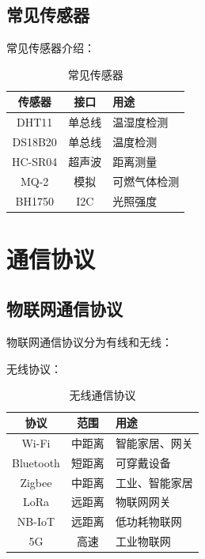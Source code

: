 \documentclass[12pt,UTF8]{ctexbook}
\begin{document}
\section{常见传感器}
\label{sec:common_sensors}

常见传感器介绍：
\begin{table}[htbp]
    \centering
    \caption{常见传感器}
    \begin{tabular}{|c|c|p{5cm}|}
        \hline
        \textbf{传感器} & \textbf{接口} & \textbf{用途} \\
        \hline
        DHT11 & 单总线 & 温湿度检测 \\
        \hline
        DS18B20 & 单总线 & 温度检测 \\
        \hline
        HC-SR04 & 超声波 & 距离测量 \\
        \hline
        MQ-2 & 模拟 & 可燃气体检测 \\
        \hline
        BH1750 & I2C & 光照强度 \\
        \hline
    \end{tabular}
\end{table}

\chapter{通信协议}
\label{chap:protocols}

\section{物联网通信协议}
\label{sec:iot_protocols}

物联网通信协议分为有线和无线：

无线协议：
\begin{table}[htbp]
    \centering
    \caption{无线通信协议}
    \begin{tabular}{|c|c|p{5cm}|}
        \hline
        \textbf{协议} & \textbf{范围} & \textbf{用途} \\
        \hline
        Wi-Fi & 中距离 & 智能家居、网关 \\
        \hline
        Bluetooth & 短距离 & 可穿戴设备 \\
        \hline
        Zigbee & 中距离 & 工业、智能家居 \\
        \hline
        LoRa & 远距离 & 物联网网关 \\
        \hline
        NB-IoT & 远距离 & 低功耗物联网 \\
        \hline
        5G & 高速 & 工业物联网 \\
        \hline
    \end{tabular}
\end{table}
\end{document}
